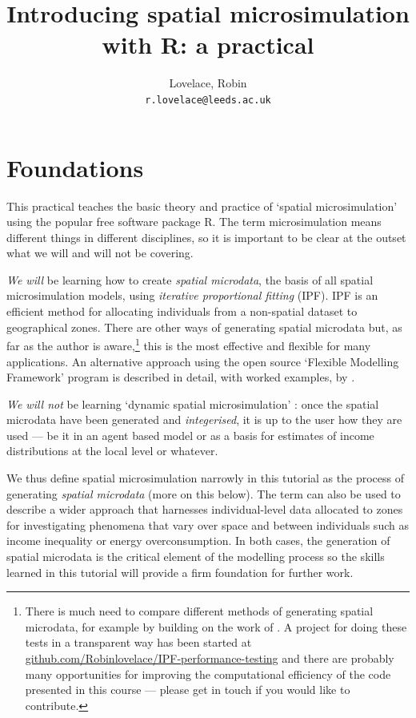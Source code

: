 \documentclass[a4paper, 11pt, twoside]{article}
\begin{document}
 
\title{Introducing spatial microsimulation with R: a practical}
\pagestyle{myheadings}
\author{Lovelace, Robin\\
\texttt{r.lovelace@leeds.ac.uk}}
\maketitle

\tableofcontents

\newpage
\section{Foundations}

This practical teaches the basic theory and practice of `spatial microsimulation'
using the popular free software package R. The term microsimulation means
different things in different disciplines, so it is important to be clear
at the outset what we will and will not be covering.

\emph{We will} be learning how to create \emph{spatial microdata}, the
basis of all spatial microsimulation models, using \emph{iterative
proportional fitting} (IPF). IPF is
an efficient method for allocating individuals from a
non-spatial dataset to geographical zones. There are other ways of generating
spatial microdata but, as far as the author is
aware,\footnote{There is much need
to compare different methods of generating spatial microdata, for example by
building on the work of \citep{harland2012}. A project for doing
these tests in a transparent way has been started at
\href{https://github.com/Robinlovelace/IPF-performance-testing}{github.com/Robinlovelace/IPF-performance-testing}
and there are probably many opportunities for improving the computational efficiency
of the code presented in this course --- please get in touch if you would
like to contribute.}
this is the most effective and flexible for many applications.
An alternative approach using the open source `Flexible Modelling Framework'
program is described in detail, with worked examples, by \citet{harland2013microsimulation}.

\emph{We will not} be learning `dynamic spatial microsimulation'
\citep{Ballas2005b}: once the
spatial microdata have been generated and \emph{integerised}, it is up to the
user how they are used --- be it in an agent based model or as a basis for
estimates of income distributions at the local level or whatever.

We thus define spatial microsimulation narrowly in this tutorial as the process
of generating \emph{spatial microdata} (more on this below). The term
can also be used to describe a wider approach that harnesses individual-level data
allocated to zones for investigating phenomena that vary over space and between individuals
such as income inequality or energy overconsumption. In both cases, the generation
of spatial microdata is the critical element of the modelling process so the skills
learned in this tutorial will provide a firm foundation for further work.
\end{document}
